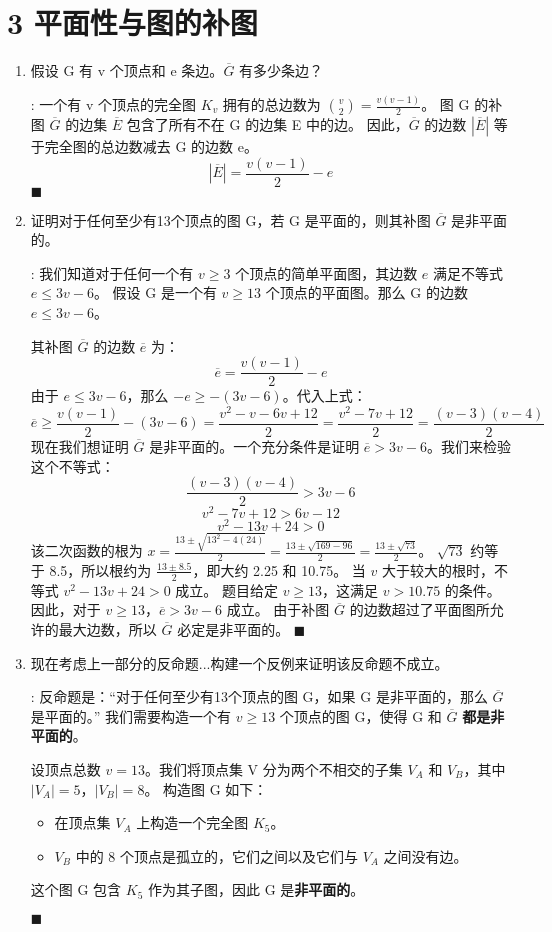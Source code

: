 \documentclass[11pt]{article}
\newenvironment{qparts}{\begin{enumerate}[{(}a{)}]}{\end{enumerate}}
\def\endproofmark{$\blacksquare$}
\newenvironment{proof}{\par\noindent{\bf 证明}:}{\endproofmark\smallskip}
\begin{document}
\section*{3 平面性与图的补图}
\begin{qparts}
\item 假设 G 有 v 个顶点和 e 条边。$\overline{G}$ 有多少条边？
\begin{proof}
一个有 v 个顶点的完全图 $K_v$ 拥有的总边数为 $\binom{v}{2} = \frac{v(v-1)}{2}$。
图 G 的补图 $\overline{G}$ 的边集 $\overline{E}$ 包含了所有不在 G 的边集 E 中的边。
因此，$\overline{G}$ 的边数 $|\overline{E}|$ 等于完全图的总边数减去 G 的边数 e。
\[ |\overline{E}| = \frac{v(v-1)}{2} - e \]
\end{proof}

\item 证明对于任何至少有13个顶点的图 G，若 G 是平面的，则其补图 $\overline{G}$ 是非平面的。
\begin{proof}
我们知道对于任何一个有 $v \ge 3$ 个顶点的简单平面图，其边数 $e$ 满足不等式 $e \le 3v-6$。
假设 G 是一个有 $v \ge 13$ 个顶点的平面图。那么 G 的边数 $e \le 3v-6$。

其补图 $\overline{G}$ 的边数 $\overline{e}$ 为：
\[ \overline{e} = \frac{v(v-1)}{2} - e \]
由于 $e \le 3v-6$，那么 $-e \ge -(3v-6)$。代入上式：
\[ \overline{e} \ge \frac{v(v-1)}{2} - (3v-6) = \frac{v^2-v-6v+12}{2} = \frac{v^2-7v+12}{2} = \frac{(v-3)(v-4)}{2} \]
现在我们想证明 $\overline{G}$ 是非平面的。一个充分条件是证明 $\overline{e} > 3v-6$。我们来检验这个不等式：
\[ \frac{(v-3)(v-4)}{2} > 3v-6 \]
\[ v^2-7v+12 > 6v-12 \]
\[ v^2-13v+24 > 0 \]
该二次函数的根为 $x = \frac{13 \pm \sqrt{13^2 - 4(24)}}{2} = \frac{13 \pm \sqrt{169-96}}{2} = \frac{13 \pm \sqrt{73}}{2}$。
$\sqrt{73}$ 约等于 8.5，所以根约为 $\frac{13 \pm 8.5}{2}$，即大约 2.25 和 10.75。
当 $v$ 大于较大的根时，不等式 $v^2-13v+24 > 0$ 成立。
题目给定 $v \ge 13$，这满足 $v > 10.75$ 的条件。因此，对于 $v \ge 13$，$\overline{e} > 3v-6$ 成立。
由于补图 $\overline{G}$ 的边数超过了平面图所允许的最大边数，所以 $\overline{G}$ 必定是非平面的。
\end{proof}

\item 现在考虑上一部分的反命题...构建一个反例来证明该反命题不成立。
\begin{proof}
反命题是：“对于任何至少有13个顶点的图 G，如果 G 是非平面的，那么 $\overline{G}$ 是平面的。”
我们需要构造一个有 $v \ge 13$ 个顶点的图 G，使得 G 和 $\overline{G}$ \textbf{都是非平面的}。

设顶点总数 $v=13$。我们将顶点集 V 分为两个不相交的子集 $V_A$ 和 $V_B$，其中 $|V_A|=5$，$|V_B|=8$。
构造图 G 如下：
\begin{itemize}
    \item 在顶点集 $V_A$ 上构造一个完全图 $K_5$。
    \item $V_B$ 中的 8 个顶点是孤立的，它们之间以及它们与 $V_A$ 之间没有边。
\end{itemize}
这个图 G 包含 $K_5$ 作为其子图，因此 G 是\textbf{非平面的}。


\end{proof}
\end{qparts}
\end{document}
